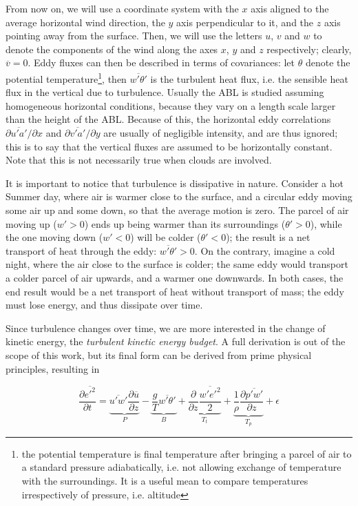 \documentclass[a4paper]{book}
\begin{document}
From now on, we will use a coordinate system with the $x$ axis aligned to the average horizontal wind direction, the $y$ axis perpendicular to it, and the $z$ axis pointing away from the surface. Then, we will use the letters $u$, $v$ and $w$ to denote the components of the wind along the axes $x$, $y$ and $z$ respectively; clearly, $\overline{v}=0$. Eddy fluxes can then be described in terms of covariances: let $\theta$ denote the potential temperature\footnote{the potential temperature is final temperature after bringing a parcel of air to a standard pressure adiabatically, i.e. not allowing exchange of temperature with the surroundings. It is a useful mean to compare temperatures irrespectively of pressure, i.e. altitude}, then $\overline{w'\theta'}$ is the turbulent heat flux, i.e. the sensible heat flux in the vertical due to turbulence. Usually the ABL is studied assuming homogeneous horizontal conditions, because they vary on a length scale larger than the height of the ABL. Because of this, the horizontal eddy correlations $\partial\overline{u'a'}/\partial x$ and $\partial\overline{v'a'}/\partial y$ are usually of negligible intensity, and are thus ignored; this is to say that the vertical fluxes are assumed to be horizontally constant. Note that this is not necessarily true when clouds are involved.

It is important to notice that turbulence is dissipative in nature. Consider a hot Summer day, where air is warmer close to the surface, and a circular eddy moving some air up and some down, so that the average motion is zero. The parcel of air moving up ($w'>0$) ends up being warmer than its surroundings ($\theta'>0$), while the one moving down ($w'<0$) will be colder ($\theta'<0$); the result is a net transport of heat through the eddy: $\overline{w'\theta'}>0$. On the contrary, imagine a cold night, where the air close to the surface is colder; the same eddy would transport a colder parcel of air upwards, and a warmer one downwards. In both cases, the end result would be a net transport of heat without transport of mass; the eddy must lose energy, and thus dissipate over time.

Since turbulence changes over time, we are more interested in the change of kinetic energy, the \emph{turbulent kinetic energy budget}. A full derivation is out of the scope of this work, but its final form \citep{basicatm} can be derived from prime physical principles, resulting in

\begin{equation}
\frac{\partial\overline{{e'}^2}}{\partial t}
=\underbrace{\overline{u'w'}\frac{\partial\overline{u}}{\partial z}}_P
-\underbrace{\frac{g}{T}\overline{w'\theta'}}_B
+\underbrace{\frac{\partial}{\partial z}\frac{\overline{w'{e'}^2}}{2}}_{T_t}
+\underbrace{\frac{1}{\rho}\frac{\partial\overline{p'w'}}{\partial z}}_{T_p}
+\epsilon
\end{equation}
\end{document}
